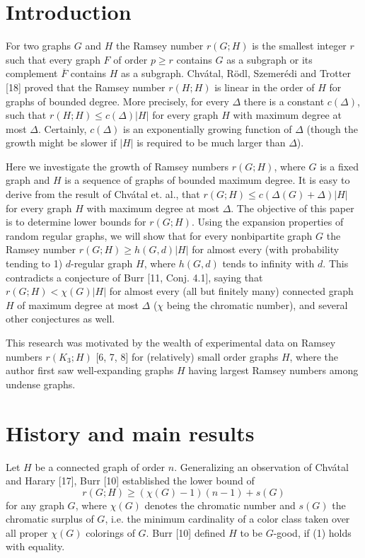 \documentclass[12pt,a4paper]{article}
\begin{document}
\section{Introduction}

For two graphs $G$ and $H$ the Ramsey number $r(G;H)$ is the smallest integer $r$ such
that every graph $F$ of order $p\ge r$ contains $G$ as a subgraph or its complement $\overline{F}$
contains $H$ as a subgraph. Chv\'atal, R\"odl, Szemer\'edi and Trotter [18] proved that
the Ramsey number $r(H;H)$ is linear in the order of $H$ for graphs of bounded degree.
More precisely, for every $\Delta$ there is a constant $c(\Delta)$, such that $r(H;H)\le c(\Delta)|H|$ for
every graph $H$ with maximum degree at most $\Delta$. Certainly, $c(\Delta)$ is an exponentially
growing function of $\Delta$ (though the growth might be slower if $|H|$ is required to be
much larger than $\Delta$).

Here we investigate the growth of Ramsey numbers $r(G;H)$, where $G$ is a fixed
graph and $H$ is a sequence of graphs of bounded maximum degree. It is easy
to derive from the result of Chv\'atal et. al., that $r(G;H)\le c(\Delta(G)+\Delta)|H|$ for
every graph $H$ with maximum degree at most $\Delta$. The objective of this paper is
to determine lower bounds for $r(G;H)$. Using the expansion properties of random
regular graphs, we will show that for every nonbipartite graph $G$ the Ramsey number
$r(G;H)\ge h(G,d)|H|$ for almost every (with probability tending to 1) $d$-regular
graph $H$, where $h(G,d)$ tends to infinity with $d$. This contradicts a conjecture of
Burr [11, Conj. 4.1], saying that $r(G;H)<\chi(G)|H|$ for almost every (all but finitely
many) connected graph $H$ of maximum degree at most $\Delta$ ($\chi$ being the chromatic
number), and several other conjectures as well.

This research was motivated by the wealth of experimental data on Ramsey
numbers $r(K_3;H)$ [6, 7, 8] for (relatively) small order graphs $H$, where the author
first saw well-expanding graphs $H$ having largest Ramsey numbers among undense
graphs.

\section{History and main results}

Let $H$ be a connected graph of order $n$. Generalizing an observation of Chv\'atal and
Harary [17], Burr [10] established the lower bound of
\begin{equation}
  r(G;H)\ge (\chi(G)-1)(n-1)+s(G)
\end{equation}
for any graph $G$, where $\chi(G)$ denotes the chromatic number and $s(G)$ the chromatic
surplus of $G$, i.e. the minimum cardinality of a color class taken over all proper $\chi(G)$
colorings of $G$. Burr [10] defined $H$ to be $G$-good, if (1) holds with equality.
\end{document}
